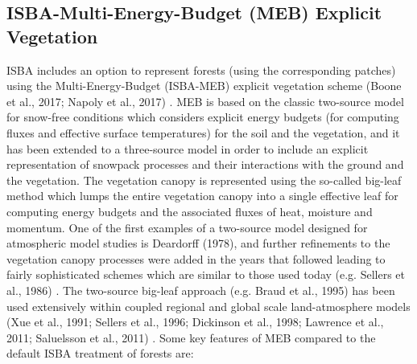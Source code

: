 \subsection{ISBA-Multi-Energy-Budget (MEB) Explicit Vegetation}
\label{sec:isba_meb}

ISBA includes an option to represent forests (using the corresponding
patches) using the Multi-Energy-Budget (ISBA-MEB) explicit vegetation
scheme (Boone et al., 2017; Napoly et al., 2017)
\nocite{boone_ea_2017,napoly_ea_2017}.
%
MEB is based on the classic two-source model for snow-free conditions
which considers explicit energy budgets (for computing fluxes and
effective surface temperatures)
for the soil and the vegetation, and it has been extended to a
three-source model in order to include an explicit representation
of snowpack processes and their interactions with the ground and
the vegetation.
%
The vegetation canopy is represented
using the so-called big-leaf method which lumps
the entire vegetation canopy into a single effective leaf
for computing energy budgets and the associated fluxes of heat,
moisture and momentum.
%
One of the first examples of a two-source model designed for
atmospheric model studies is 
Deardorff (1978)\nocite{Deardorff1978}, 
and further refinements to the vegetation canopy
processes were added in the years that followed leading to
fairly sophisticated schemes 
which are similar to those used today (e.g. Sellers et al., 1986)
\nocite{Sellers86}.
%
The two-source big-leaf approach 
(e.g. Braud et al., 1995)
\nocite{Braud_ea_1995}
has been used extensively
within coupled regional and global scale land-atmosphere models 
(Xue et al., 1991; Sellers et al., 1996; Dickinson et al., 1998;
Lawrence et al., 2011; Saluelsson et al., 2011)
\nocite{Xue91,Sellers96,Dickinson1998,Lawrence2011,Samuelsson11}.
%
Some key features of MEB compared to the default 
ISBA treatment of
forests are:

